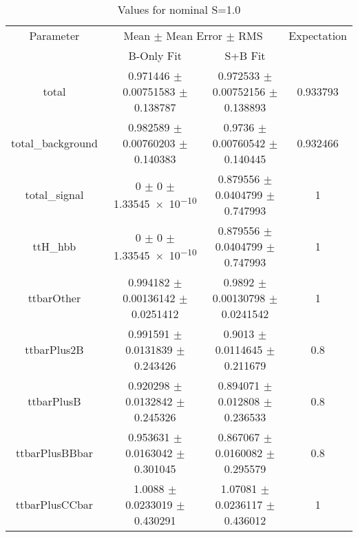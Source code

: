 \begin{table}
\centering
\caption{Values for nominal S=1.0}
\begin{tabular}{cccc}
\toprule
Parameter & \multicolumn{2}{c}{Mean $\pm$ Mean Error $\pm$ RMS} & Expectation\\
 & B-Only Fit & S+B Fit & \\
\midrule
total & \num{0.971446} $\pm$ \num{0.00751583} $\pm$ \num{0.138787} & \num{0.972533} $\pm$ \num{0.00752156} $\pm$ \num{0.138893} & \num{0.933793}\\
total\_background & \num{0.982589} $\pm$ \num{0.00760203} $\pm$ \num{0.140383} & \num{0.9736} $\pm$ \num{0.00760542} $\pm$ \num{0.140445} & \num{0.932466}\\
total\_signal & \num{0} $\pm$ \num{0} $\pm$ \num{1.33545e-10} & \num{0.879556} $\pm$ \num{0.0404799} $\pm$ \num{0.747993} & \num{1}\\
ttH\_hbb & \num{0} $\pm$ \num{0} $\pm$ \num{1.33545e-10} & \num{0.879556} $\pm$ \num{0.0404799} $\pm$ \num{0.747993} & \num{1}\\
ttbarOther & \num{0.994182} $\pm$ \num{0.00136142} $\pm$ \num{0.0251412} & \num{0.9892} $\pm$ \num{0.00130798} $\pm$ \num{0.0241542} & \num{1}\\
ttbarPlus2B & \num{0.991591} $\pm$ \num{0.0131839} $\pm$ \num{0.243426} & \num{0.9013} $\pm$ \num{0.0114645} $\pm$ \num{0.211679} & \num{0.8}\\
ttbarPlusB & \num{0.920298} $\pm$ \num{0.0132842} $\pm$ \num{0.245326} & \num{0.894071} $\pm$ \num{0.012808} $\pm$ \num{0.236533} & \num{0.8}\\
ttbarPlusBBbar & \num{0.953631} $\pm$ \num{0.0163042} $\pm$ \num{0.301045} & \num{0.867067} $\pm$ \num{0.0160082} $\pm$ \num{0.295579} & \num{0.8}\\
ttbarPlusCCbar & \num{1.0088} $\pm$ \num{0.0233019} $\pm$ \num{0.430291} & \num{1.07081} $\pm$ \num{0.0236117} $\pm$ \num{0.436012} & \num{1}\\
\bottomrule
\end{tabular}
\end{table}